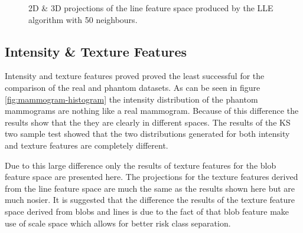 \begin{figure}[H]
	\centering
	\caption{2D \& 3D projections of the line feature space produced by the LLE algorithm with 50 neighbours.}\label{fig:line_LLE_mapping}
\end{figure}
\clearpage

\subsection{Intensity \& Texture Features}
\label{subsec:results-texture}
Intensity and texture features proved proved the least successful for the comparison of the real and phantom datasets. As can be seen in figure \ref{fig:mammogram-histogram} the intensity distribution of the phantom mammograms are nothing like a real mammogram. Because of this difference the results show that the they are clearly in different spaces. The results of the KS two sample test showed that the two distributions generated for both intensity and texture features are completely different. 

Due to this large difference only the results of texture features for the blob feature space are presented here. The projections for the texture features derived from the line feature space are much the same as the results shown here but are much nosier. It is suggested that the difference the results of the texture feature space derived from blobs and lines is due to the fact of that blob feature make use of scale space which allows for better risk class separation.

